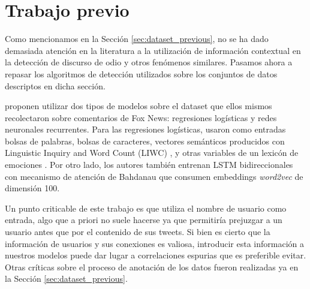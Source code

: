 \section{Trabajo previo}
\label{sec:06_classification_previous}

Como mencionamos en la Sección \ref{sec:dataset_previous}, no se ha dado demasiada atención en la literatura a la utilización de información contextual en la detección de discurso de odio y otros fenómenos similares. Pasamos ahora a repasar los algoritmos de detección utilizados sobre los conjuntos de datos descriptos en dicha sección.

\citet{gao-huang-2017-detecting} proponen utilizar dos tipos de modelos sobre el dataset que ellos mismos recolectaron sobre comentarios de Fox News: regresiones logísticas y redes neuronales recurrentes. Para las regresiones logísticas, usaron como entradas bolsas de palabras, bolsas de caracteres, vectores semánticos producidos con Linguistic Inquiry and Word Count (LIWC) \cite{pennebaker2001linguistic}, y otras variables de un lexicón de emociones \cite{mohammad2013nrc}. Por otro lado, los autores también entrenan LSTM bidireccionales con mecanismo de atención de Bahdanau \cite{bahdanau2014neural} que consumen embeddings \emph{word2vec} de dimensión 100.

Un punto criticable de este trabajo es que utiliza el nombre de usuario como entrada, algo que a priori no suele hacerse ya que permitiría prejuzgar a un usuario antes que por el contenido de sus tweets. Si bien es cierto que la información de usuarios y sus conexiones es valiosa, introducir esta información a nuestros modelos puede dar lugar a correlaciones espurias que es preferible evitar. Otras críticas sobre el proceso de anotación de los datos fueron realizadas ya en la Sección \ref{sec:dataset_previous}.


